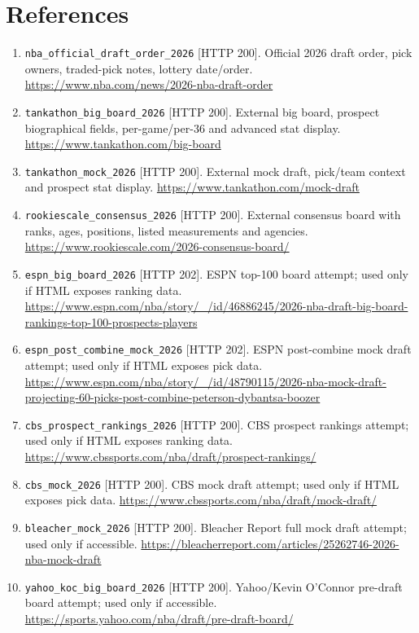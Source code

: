 \documentclass[11pt]{article}
\begin{document}
\section{References}

\scriptsize
\begin{enumerate}[leftmargin=*, itemsep=2pt]
\item \texttt{nba\_official\_draft\_order\_2026} [HTTP 200]. Official 2026 draft order, pick owners, traded-pick notes, lottery date/order. \url{https://www.nba.com/news/2026-nba-draft-order}
\item \texttt{tankathon\_big\_board\_2026} [HTTP 200]. External big board, prospect biographical fields, per-game/per-36 and advanced stat display. \url{https://www.tankathon.com/big-board}
\item \texttt{tankathon\_mock\_2026} [HTTP 200]. External mock draft, pick/team context and prospect stat display. \url{https://www.tankathon.com/mock-draft}
\item \texttt{rookiescale\_consensus\_2026} [HTTP 200]. External consensus board with ranks, ages, positions, listed measurements and agencies. \url{https://www.rookiescale.com/2026-consensus-board/}
\item \texttt{espn\_big\_board\_2026} [HTTP 202]. ESPN top-100 board attempt; used only if HTML exposes ranking data. \url{https://www.espn.com/nba/story/_/id/46886245/2026-nba-draft-big-board-rankings-top-100-prospects-players}
\item \texttt{espn\_post\_combine\_mock\_2026} [HTTP 202]. ESPN post-combine mock draft attempt; used only if HTML exposes pick data. \url{https://www.espn.com/nba/story/_/id/48790115/2026-nba-mock-draft-projecting-60-picks-post-combine-peterson-dybantsa-boozer}
\item \texttt{cbs\_prospect\_rankings\_2026} [HTTP 200]. CBS prospect rankings attempt; used only if HTML exposes ranking data. \url{https://www.cbssports.com/nba/draft/prospect-rankings/}
\item \texttt{cbs\_mock\_2026} [HTTP 200]. CBS mock draft attempt; used only if HTML exposes pick data. \url{https://www.cbssports.com/nba/draft/mock-draft/}
\item \texttt{bleacher\_mock\_2026} [HTTP 200]. Bleacher Report full mock draft attempt; used only if accessible. \url{https://bleacherreport.com/articles/25262746-2026-nba-mock-draft}
\item \texttt{yahoo\_koc\_big\_board\_2026} [HTTP 200]. Yahoo/Kevin O'Connor pre-draft board attempt; used only if accessible. \url{https://sports.yahoo.com/nba/draft/pre-draft-board/}

\end{enumerate}
\end{document}
